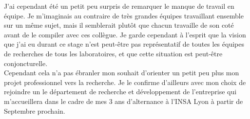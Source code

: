 J'ai cependant été un petit peu surpris de remarquer le manque de travail en équipe. Je m'imaginais au contraire de très grandes équipes travaillant ensemble sur un même sujet, mais il semblerait plutôt que chacun travaille de son coté avant de le compiler avec ces collègue. Je garde cependant à l'esprit que la vision que j'ai eu durant ce stage n'est peut-être pas représentatif de toutes les équipes de recherches de tous les laboratoires, et que cette situation est peut-être conjoncturelle.\\

Cependant cela n'a pas ébranler mon souhait d'orienter un petit peu plus mon projet professionnel vers la recherche. Je le confirme d'ailleurs avec mon choix de rejoindre un le département de recherche et développement de l'entreprise qui m'accueillera dans le cadre de mes 3 ans d'alternance à l'INSA Lyon à partir de Septembre prochain.